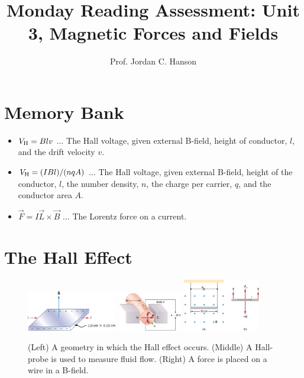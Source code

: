 \documentclass{article}
\begin{document}
\title{Monday Reading Assessment: Unit 3, Magnetic Forces and Fields}
\author{Prof. Jordan C. Hanson}

\maketitle

\section{Memory Bank}

\begin{itemize}
\item $V_{\rm H} = B l v$ ... The Hall voltage, given external B-field, height of conductor, $l$, and the drift velocity $v$.
\item $V_{\rm H} = (I B l)/(n q A)$ ... The Hall voltage, given external B-field, height of the conductor, $l$, the number density, $n$, the charge per carrier, $q$, and the conductor area $A$.
\item $\vec{F} = I\vec{L} \times \vec{B}$ ... The Lorentz force on a current.
\end{itemize}

\section{The Hall Effect}

\begin{figure}[ht]
\centering
\includegraphics[width=0.35\textwidth]{hall.jpeg}
\includegraphics[width=0.25\textwidth]{hall2.jpeg} \hspace{0.2cm}
\includegraphics[width=0.3\textwidth]{forceWire.jpeg}
\caption{\label{fig:hall} (Left) A geometry in which the Hall effect occurs. (Middle) A Hall-probe is used to measure fluid flow. (Right) A force is placed on a wire in a B-field.}
\end{figure}
\end{document}
